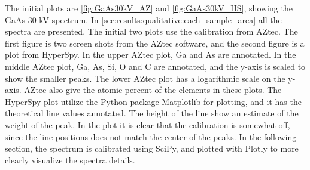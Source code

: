 The initial plots are \cref{fig:GaAs30kV_AZ} and \cref{fig:GaAs30kV_HS}, showing the GaAs 30 kV spectrum.
In \cref{sec:results:qualitative:each_sample_area} all the spectra are presented.
The initial two plots use the calibration from AZtec.
The first figure is two screen shots from the AZtec software, and the second figure is a plot from HyperSpy.
In the upper AZtec plot, Ga and As are annotated.
In the middle AZtec plot, Ga, As, Si, O and C are annotated, and the y-axis is scaled to show the smaller peaks.
The lower AZtec plot has a logarithmic scale on the y-axis.
AZtec also give the atomic percent of the elements in these plots.
The HyperSpy plot utilize the Python package Matplotlib for plotting, and it has the theoretical line values annotated.
The height of the line show an estimate of the weight of the peak.
In the plot it is clear that the calibration is somewhat off, since the line positions does not match the center of the peaks.
In the following section, the spectrum is calibrated using SciPy, and plotted with Plotly to more clearly visualize the spectra details.

